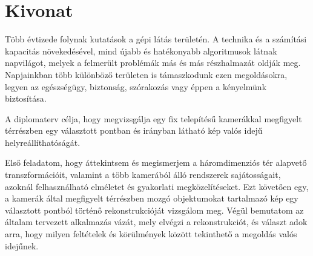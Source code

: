 
\hungarianParagraph

\chapter*{Kivonat}

Több évtizede folynak kutatások a gépi látás területén. A technika és a számítási kapacitás növekedésével, mind újabb és hatékonyabb algoritmusok látnak napvilágot, melyek a felmerült problémák más és más részhalmazát oldják meg. Napjainkban több különböző területen is támaszkodunk ezen megoldásokra, legyen az egészségügy, biztonság, szórakozás vagy éppen a kényelmünk biztosítása.

A diplomaterv célja, hogy megvizsgálja egy fix telepítésű kamerákkal megfigyelt térrészben egy választott pontban és irányban látható kép valós idejű helyreállíthatóságát.

Első feladatom, hogy áttekintsem és megismerjem a háromdimenziós tér alapvető transzformációit, valamint a több kamerából álló rendszerek sajátosságait, azoknál felhasználható elméletet és gyakorlati megközelítéseket. Ezt követően egy, a kamerák által megfigyelt térrészben mozgó objektumokat tartalmazó kép egy választott pontból történő rekonstrukcióját vizsgálom meg. Végül bemutatom az általam tervezett alkalmazás vázát, mely elvégzi a rekonstrukciót, és választ adok arra, hogy milyen feltételek és körülmények között tekinthető a megoldás valós idejűnek.


\vfill








\dolgozatnyelve
{}

\setcounter{romanPage}{\value{page}}

